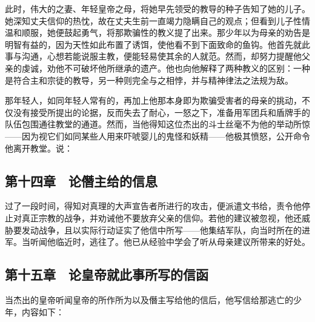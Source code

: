 此时，伟大的之妻、年轻皇帝之母，将她早先领受的教导的种子告知了她的儿子。她深知丈夫信仰的热忱，故在丈夫生前一直竭力隐瞒自己的观点；但看到儿子性情温和顺服，她便鼓起勇气，将那欺骗性的教义提了出来。那少年以为母亲的劝告是明智有益的，因为天性如此布置了诱饵，使他看不到下面致命的鱼钩。他首先就此事与沟通，心想若能说服主教，便能轻易使其余的人就范。然而，却努力提醒他父亲的虔诚，劝他不可破坏他所继承的遗产。他也向他解释了两种教义的区别：一种是符合主和宗徒的教导，另一种则完全与之相悖，并与精神律法之法规为敌。\par

那年轻人，如同年轻人常有的，再加上他那本身即为欺骗受害者的母亲的挑动，不仅没有接受所提出的论据，反而失去了耐心，一怒之下，准备用军团兵和盾牌手的队伍包围通往教堂的通道。然而，当他得知这位杰出的斗士丝毫不为他的举动所惊——因为视它们如同某些人用来吓唬婴儿的鬼怪和妖精——他极其愤怒，公开命令他离开教堂。说：\par


\subsection{第十四章　论僭主给的信息}

过了一段时间，得知对真理的大声宣告者所进行的攻击，便派遣文书给，责令他停止对真正宗教的战争，并劝诫他不要放弃父亲的信仰。若他的建议被忽视，他还威胁要发动战争，且以实际行动证实了他信中所写——他集结军队，向当时所在的进军。当听闻他临近时，逃往了。他已从经验中学会了听从母亲建议所带来的好处。\par


\subsection{第十五章　论皇帝就此事所写的信函}

当杰出的皇帝听闻皇帝的所作所为以及僭主写给他的信后，他写信给那逃亡的少年，内容如下：\par

